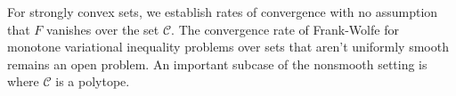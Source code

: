 \documentclass[pdflatex,sn-mathphys-num]{sn-jnl}%
\newcommand\C{\mathcal{C}}
\theoremstyle{thmstyleone}%
\theoremstyle{thmstyletwo}%
\theoremstyle{thmstylethree}%
\begin{document}
For strongly convex sets, we establish rates of convergence with no assumption that $F$ vanishes over the set $\C$. The convergence
rate of Frank-Wolfe for monotone variational inequality problems over sets that aren't uniformly smooth remains an open problem.
An important subcase of the nonsmooth setting is where $\C$ is a polytope.

\end{document}
